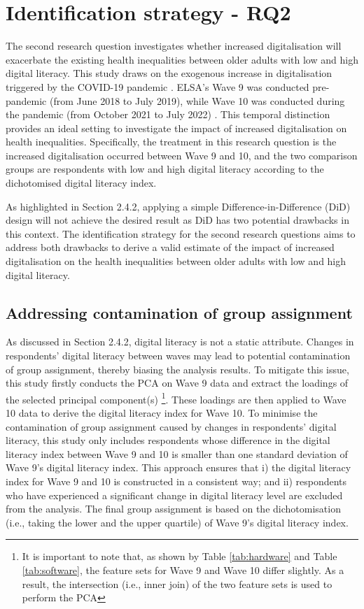 \section{Identification strategy - RQ2}
The second research question investigates whether increased digitalisation will exacerbate the existing health inequalities between older adults with low and high  digital literacy. This study draws on the exogenous increase in digitalisation triggered by the COVID-19 pandemic \parencite{pandit_smartphone_2022,spanakis_digital_2021}. ELSA's Wave 9 was conducted pre-pandemic (from June 2018 to July 2019), while Wave 10 was conducted during the pandemic (from October 2021 to July 2022) \parencite{natcensocialresearch_user_2020,natcensocialresearch_interviewer_2022}. This temporal distinction provides an ideal setting to investigate the impact of increased digitalisation on health inequalities. Specifically, the treatment in this research question is the increased digitalisation occurred between Wave 9 and 10, and the two comparison groups are respondents with low and high digital literacy according to the dichotomised digital literacy index.

As highlighted in Section 2.4.2, applying a simple Difference-in-Difference (DiD) design will not achieve the desired result as DiD has two potential drawbacks in this context. The identification strategy for the second research questions aims to address both drawbacks to derive a valid estimate of the impact of increased digitalisation on the health inequalities between older adults with low and high digital literacy.

\subsection{Addressing contamination of group assignment}
As discussed in Section 2.4.2, digital literacy is not a static attribute. Changes in respondents' digital literacy between waves may lead to potential contamination of group assignment, thereby biasing the analysis results. To mitigate this issue, this study firstly conducts the PCA on Wave 9 data and extract the loadings of the selected principal component(s) \footnote{It is important to note that, as shown by Table \ref{tab:hardware} and Table \ref{tab:software}, the feature sets for Wave 9 and Wave 10 differ slightly. As a result, the intersection (i.e., inner join) of the two feature sets is used to perform the PCA}. These loadings are then applied to Wave 10 data to derive the digital literacy index for Wave 10. To minimise the contamination of group assignment caused by changes in respondents' digital literacy, this study only includes respondents whose difference in the digital literacy index between Wave 9 and 10 is smaller than one standard deviation of Wave 9's digital literacy index. This approach ensures that i) the digital literacy index for Wave 9 and 10 is constructed in a consistent way; and ii) respondents who have experienced a significant change in digital literacy level are excluded from the analysis. The final group assignment is based on the dichotomisation (i.e., taking the lower and the upper quartile) of Wave 9's digital literacy index.

